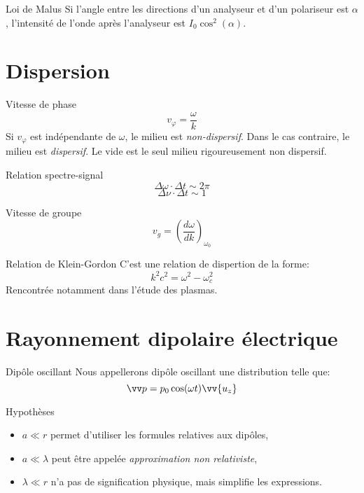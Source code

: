 \documentclass[french, a4paper, 11pt, twocolumn]{article}
\newcommand{\po}{\left(}         %
\newcommand{\pf}{\right)}        %
\newcommand{\pof}[1]{\po #1 \pf} %
\newcommand{\vect}[1]{\vv{#1}}
\newcommand{\uz}{\vect{u_z}}          %
\begin{document}
\begin{cadre}{Loi de Malus}
  Si l'angle entre les directions d'un analyseur et d'un polariseur est $\alpha$, l'intensité de l'onde après l'analyseur est $I_{0}\cos^{2}(\alpha)$.
\end{cadre}

\section{Dispersion}
\begin{cadre}{Vitesse de phase}
  \[v_{\varphi}=\dfrac{\omega}{k}\]
  Si $v_{\varphi}$ est indépendante de $\omega$, le milieu est \emph{non-dispersif}. Dans le cas contraire, le milieu est \emph{dispersif}.
  Le vide est le seul milieu rigoureusement non dispersif.
\end{cadre}

\begin{cadre}{Relation spectre-signal}
  \[\Delta\omega\cdot\Delta t \sim 2\pi\]
  \[\Delta\nu\cdot\Delta t \sim 1\]
\end{cadre}

\begin{cadre}{Vitesse de groupe}
  \[v_{g}=\pof{\dfrac{d\omega}{dk}}_{\omega_{0}}\]
\end{cadre}

\begin{cadre}{Relation de Klein-Gordon}
  C'est une relation de dispertion de la forme:
  \[k^{2}c^{2} = \omega^{2}-\omega_{c}^{2}\]
  Rencontrée notamment dans l'étude des plasmas.
\end{cadre}

\section{Rayonnement dipolaire électrique}
\begin{cadre}{Dipôle oscillant}
  Nous appellerons dipôle oscillant une distribution telle que:
  \[\vv p = p_{0}\cos(\omega t)\uz\]
\end{cadre}

\begin{cadre}{Hypothèses}
  \begin{itemize}[label=$\bullet$]
    \item $a\ll r$ permet d'utiliser les formules relatives aux dipôles,
    \item $a\ll\lambda$ peut être appelée \emph{approximation non relativiste},
    \item $\lambda\ll r$ n'a pas de signification physique, mais simplifie les expressions.
  \end{itemize}
\end{cadre}
\end{document}
